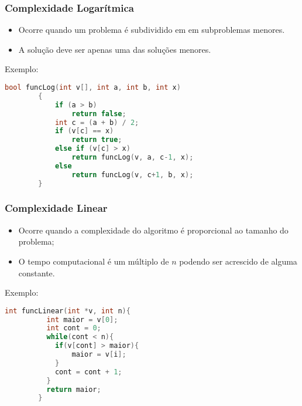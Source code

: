 \documentclass[10pt]{beamer}
\begin{document}
\begin{frame}[fragile, t]
    \frametitle{Complexidade Logarítmica}
    \begin{itemize}
        \item Ocorre quando um problema é subdividido em em subproblemas menores.
        \item A solução deve ser apenas uma das soluções menores.
    \end{itemize}
    \pause Exemplo:
    \begin{lstlisting}[language=C++, basicstyle=\small]
        bool funcLog(int v[], int a, int b, int x)
        {
            if (a > b)
                return false;
            int c = (a + b) / 2;
            if (v[c] == x)
                return true;
            else if (v[c] > x)
                return funcLog(v, a, c-1, x);
            else
                return funcLog(v, c+1, b, x);
        }
    \end{lstlisting}

\end{frame}


\begin{frame}[fragile, t]
    \frametitle{Complexidade Linear}
    \begin{itemize}
        \item Ocorre quando a complexidade do algoritmo é proporcional ao tamanho do problema;
        \item O tempo computacional é um múltiplo de $n$ podendo ser acrescido de alguma constante.
    \end{itemize}
    \pause Exemplo:
    \begin{lstlisting}[language=C++, basicstyle=\small]
        int funcLinear(int *v, int n){ 
          int maior = v[0];
          int cont = 0;
          while(cont < n){
            if(v[cont] > maior){
                maior = v[i];
            }
            cont = cont + 1;
          }
          return maior;
        } 
    \end{lstlisting}

\end{frame}
\end{document}
